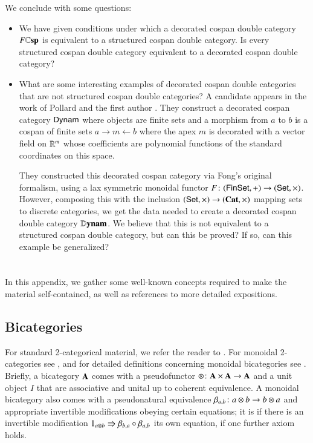 \documentclass[reqno]{amsart}
\begin{document}
We conclude with some questions:

\begin{itemize}
\item We have given conditions under which a decorated cospan double category $F \mathbf{\mathbb Csp}$ is
equivalent to a structured cospan double category.    Is every structured cospan double category 
equivalent to a decorated cospan double category?
\item What are some interesting examples of decorated cospan double categories that are not structured cospan double categories?   A candidate appears in the work of Pollard and the first author \cite{BP}.  They construct a decorated cospan category $\mathsf{Dynam}$ where objects are finite sets and a morphism from $a$ to $b$ is a cospan of finite sets $a \rightarrow m \leftarrow b$ where the apex $m$ is decorated with a vector field on $\mathbb{R}^m$ whose coefficients are polynomial functions of the standard coordinates on this space.

They constructed this decorated cospan category via Fong's original formalism, using a lax symmetric monoidal functor $F \colon (\mathsf{Fin}\mathsf{Set}, +) \to (\mathsf{Set}, \times)$.  However, composing this with the inclusion $(\mathsf{Set}, \times) \to (\mathbf{Cat}, \times)$ mapping sets to discrete categories, we get the data needed to create a decorated cospan double category $\mathbf{\mathbb D}\mathbf{ynam}$.   We believe that this is not equivalent to a structured cospan double category, but can this be proved?  If so, can this example be generalized?
\end{itemize}

\appendix

\section{}
In this appendix, we gather some well-known concepts required to make the material self-contained, as well as references to more detailed expositions.

\subsection{Bicategories}
\label{subsec:bicats}

For standard 2-categorical material, we refer the reader to \cite{KS}.  For monoidal 2-categories see \cite{DS}, and for detailed definitions concerning monoidal bicategories see \cite{GPS,McCrudden,Stay}.  
Briefly, a  bicategory $\mathbf{A}$ comes with a pseudofunctor $\otimes\colon\mathbf{A}\times\mathbf{A}\to\mathbf{A}$ and a unit object $I$ that are associative and unital up to coherent equivalence. A  monoidal bicategory also comes with a pseudonatural equivalence $\beta_{a,b}\colon a\otimes b\to b\otimes a$ and appropriate invertible modifications obeying certain equations; it is  if there is an invertible modification $1_{a\otimes b}\Rrightarrow\beta_{b,a}\circ\beta_{a,b}$ its own equation,  if one further axiom holds. 
\end{document}
